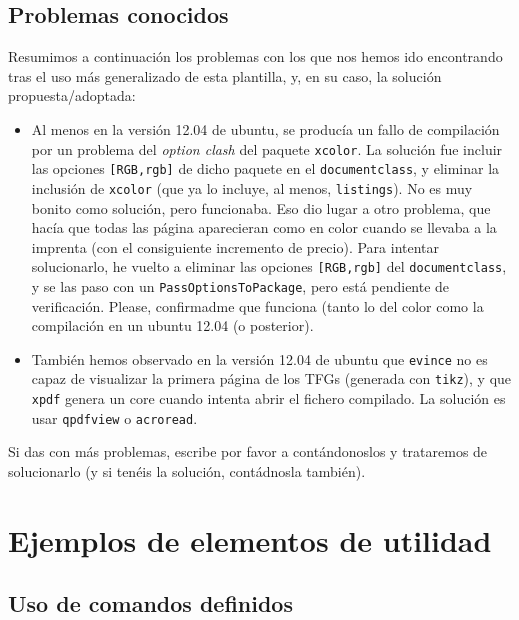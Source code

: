 \subsection{Problemas conocidos}
\label{sec:problemas-conocidos}

Resumimos a continuación los problemas con los que nos hemos ido encontrando tras el uso más generalizado de esta plantilla, y, en su caso, la solución propuesta/adoptada:

\begin{itemize}

  \item Al menos en la versión 12.04 de ubuntu, se producía un fallo de compilación por un problema del \textit{option clash} del paquete \texttt{xcolor}. La solución fue incluir las opciones \texttt{[RGB,rgb]} de dicho paquete en el \texttt{documentclass}, y eliminar la inclusión de \texttt{xcolor} (que ya lo incluye, al menos, \texttt{listings}). No es muy bonito como solución, pero funcionaba. Eso dio lugar a otro problema, que hacía que todas las página aparecieran como en color cuando se llevaba a la imprenta (con el consiguiente incremento de precio). Para intentar solucionarlo, he vuelto a eliminar las opciones \texttt{[RGB,rgb]} del \texttt{documentclass}, y se las paso con un \texttt{PassOptionsToPackage}, pero está pendiente de verificación. Please, confirmadme que funciona (tanto lo del color como la compilación en un ubuntu 12.04 (o posterior).

  \item También hemos observado en la versión 12.04 de ubuntu que \texttt{evince} no es capaz de visualizar la primera página de los TFGs (generada con \texttt{tikz}), y que \texttt{xpdf} genera un core cuando intenta abrir el fichero compilado. La solución es usar \texttt{qpdfview} o \texttt{acroread}.

\end{itemize}

Si das con más problemas, escribe por favor a \contactauthor contándonoslos y trataremos de solucionarlo (y si tenéis la solución, contádnosla también).


\section{Ejemplos de elementos de utilidad}
\label{sec:ejempl-de-elem}

\subsection{Uso de comandos definidos}
\label{sec:uso-de-comandos}

